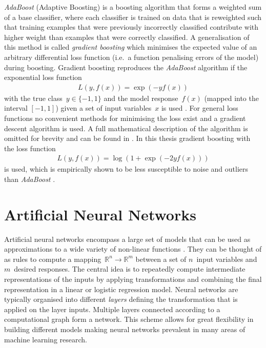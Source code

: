 \emph{AdaBoost} (Adaptive Boosting) is a boosting algorithm that forms a
weighted sum of a base classifier, where each classifier is trained on data that
is reweighted such that training examples that were previously incorrectly
classified contribute with higher weight than examples that were correctly
classified. A generalisation of this method is called \emph{gradient boosting}
which minimises the expected value of an arbitrary differential loss function
(i.e.\ a function penalising errors of the model) during boosting. Gradient
boosting reproduces the \emph{AdaBoost} algorithm if the exponential loss
function
\begin{align*}
  L\left(y, f(x)\right) = \exp\left(- y f(x)\right)
\end{align*}
with the true class~$y \in \{ -1, 1 \}$ and the model response~$f(x)$ (mapped
into the interval $[-1, 1]$) given a set of input variables~$x$ is used
\cite{esl}. For general loss functions no convenient methods for minimising the
loss exist and a gradient descent algorithm is used. A full mathematical
description of the algorithm is omitted for brevity and can be found in
\cite{friedman_gbm, esl}. In this thesis gradient boosting with the loss
function
\begin{align*}
  L\left(y, f(x)\right) = \log\left( 1 + \exp(- 2 y f(x)) \right)
\end{align*}
is used, which is empirically shown to be less susceptible to noise and outliers
than \emph{AdaBoost} \cite{esl, schapire_boosting}.

\section{Artificial Neural Networks}
\label{sec:nn}

Artificial neural networks encompass a large set of models that can be used as
approximations to a wide variety of non-linear functions \cite{hornik}. They can
be thought of as rules to compute a
mapping~\mbox{$\mathbb{R}^n \rightarrow \mathbb{R}^m$} between a set of
$n$~input variables and $m$~desired responses. The central idea is to repeatedly
compute intermediate representations of the inputs by applying transformations
and combining the final representation in a linear or logistic regression model.
Neural networks are typically organised into different \emph{layers} defining
the transformation that is applied on the layer inputs. Multiple layers
connected according to a computational graph form a network. This scheme allows
for great flexibility in building different models making neural networks
prevalent in many areas of machine learning research.

